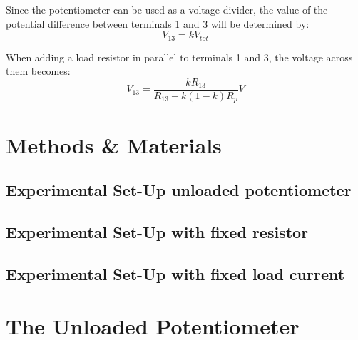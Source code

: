 \documentclass[a4paper]{article}
\begin{document}
Since the potentiometer can be used as a voltage divider, the value of the
potential difference between terminals 1 and 3 will be determined by:
\begin{equation}
    V_{13} = k V_{tot}
\end{equation} 

When adding a load resistor in parallel to terminals 1 and 3, the voltage across
them becomes:
\begin{equation}
    V_{13} = \frac{kR_{13}}{R_{13}+k(1-k)R_p} V
\end{equation}
\section{Methods \& Materials}

\subsection{Experimental Set-Up unloaded potentiometer}

\subsection{Experimental Set-Up with fixed resistor}

\subsection{Experimental Set-Up with fixed load current}
\section{The Unloaded Potentiometer}
\end{document}
